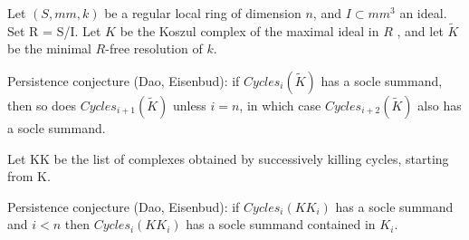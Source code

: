 Let $(S, mm, k)$ be a regular local ring of dimension $n$, and $I\subset mm^3$ an ideal. Set R = S/I.
Let $K$ be the Koszul complex of the maximal ideal in $R$ , and let $\widetilde K$ be the 
minimal $R$-free resolution of $k$. 

Persistence conjecture (Dao, Eisenbud): if $Cycles_i(\widetilde K)$ has a socle summand, then so does 
$Cycles_{i+1}(\widetilde K)$ unless $i=n$, in which case $Cycles_{i+2}(\widetilde K)$ also has a socle summand.

Let KK be the list of complexes obtained by successively killing cycles, starting from K.

Persistence conjecture (Dao, Eisenbud): if $Cycles_i(KK_i)$ has a socle summand and $i<n$ then  
$Cycles_i(KK_i)$ has a socle summand  contained in $K_i$.
